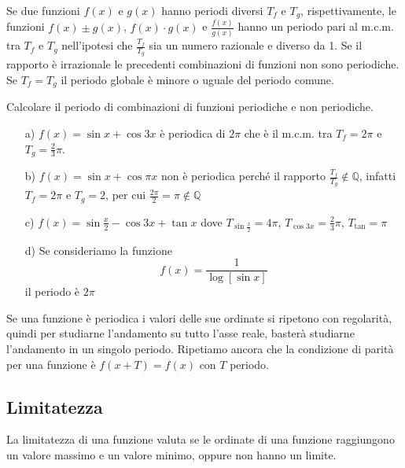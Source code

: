 Se due funzioni \(f(x)\) e \(g(x)\) hanno periodi diversi \(T_f\) e \(T_g\), 
rispettivamente, le funzioni \(f(x)\pm g(x)\), \(f(x)\cdot g(x)\) e 
\(\frac{f(x)}{g(x)}\) hanno un periodo pari al m.c.m. tra \(T_f\) e \(T_g\) 
nell'ipotesi che \(\frac{T_f}{T_g}\) sia un numero razionale e diverso da 1. Se 
il rapporto è irrazionale le precedenti combinazioni di funzioni non sono 
periodiche. Se \(T_f=T_g\) il periodo globale è minore o uguale del periodo 
comune.

\begin{esempio} Calcolare il periodo di combinazioni di funzioni periodiche e 
non periodiche.

  \begin{itemize}
  \item[a)] \(f(x)=\sin x+\cos 3x\) è periodica di \(2\pi\) che è 
il m.c.m. tra \(T_f=2\pi\) e \(T_g=\frac{2}{3}\pi\).
  
  \item[b)] \(f(x)=\sin x+\cos \pi x\) non è periodica perché il 
rapporto \(\frac{T_f}{T_g}\notin \mathbb{Q}\), infatti \(T_f=2\pi\) e \(T_g=2\), 
per cui \(\frac{2\pi}{2}=\pi\notin\mathbb{Q}\)
  
  \item[c)] \(f(x)=\sin \frac{x}{2}-\cos 3x+\tan x\) dove 
\(T_{\sin \frac{x}{2}}=4\pi\), \(T_{\cos 3x}=\frac{2}{3}\pi\), \(T_{\tan}=\pi\)
  
  \item[d)] Se consideriamo la funzione 
\[f(x)=\frac{1}{\log[\sin x]}\]
il periodo è \(2\pi\)
\end{itemize}
\end{esempio}

Se una funzione è periodica i valori delle sue ordinate si ripetono con 
regolarità, quindi per studiarne l'andamento su tutto l'asse reale, basterà 
studiarne l'andamento in un singolo periodo. Ripetiamo ancora che la 
condizione di parità per una funzione è \(f(x+T)=f(x)\) con \(T\) periodo.

\subsection{Limitatezza}
La limitatezza di una funzione valuta se le ordinate di una funzione 
raggiungono un valore massimo e un valore minimo, oppure non hanno un 
limite.

